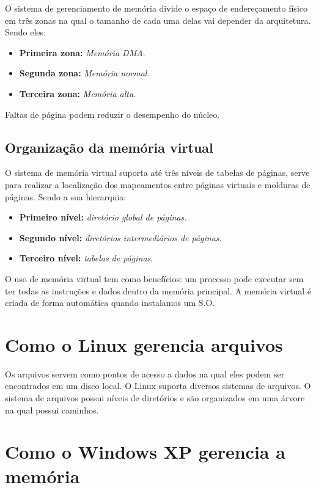 \documentclass[
	12pt,				%
	oneside,   	        %
	a4paper,			%
	english,			%
	french,				%
	spanish,			%
	brazil,				%
	]{pacotes/abntex2}
\begin{document}
O sistema de gerenciamento de memória divide o espaço de endereçamento físico em três zonas na qual o tamanho de cada uma delas vai depender da arquitetura. Sendo eles:

\begin{itemize}
    \item \textbf{Primeira zona:} \textit{Memória DMA}.
    \item \textbf{Segunda zona:} \textit{Memória normal}.
    \item \textbf{Terceira zona:} \textit{Memória alta}.
\end{itemize}

Faltas de página podem reduzir o desempenho do núcleo.

\subsection{\textbf{Organização da memória virtual}}
\label{subsec:organizacao-memoria-virtual}

O sistema de memória virtual suporta até três níveis de tabelas de páginas, serve para realizar a localização dos mapeamentos entre páginas virtuais e molduras de páginas. Sendo a sua hierarquia:

\begin{itemize}
    \item \textbf{Primeiro nível:} \textit{diretório global de páginas}.
    \item \textbf{Segundo nível:} \textit{diretórios intermediários de páginas}.
    \item \textbf{Terceiro nível:} \textit{tabelas de páginas}.
\end{itemize}

O uso de memória virtual tem como benefícios: um processo pode executar sem ter todas as instruções e dados dentro da memória principal. A memória virtual é criada de forma automática quando instalamos um S.O.

\section{\textbf{Como o Linux gerencia arquivos}}
\label{sec:arq-arquivos}

Os arquivos servem como pontos de acesso a dados na qual eles podem ser encontrados em um disco local. O Linux suporta diversos sistemas de arquivos. O sistema de arquivos possui níveis de diretórios e são organizados em uma árvore na qual possui caminhos.

\section{\textbf{Como o Windows XP gerencia a memória}}
\label{sec:arq-memoria-windows}
\end{document}
